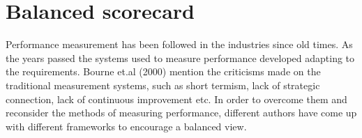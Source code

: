 



\section{Balanced scorecard}
Performance measurement has been followed in the industries since old times. As the years passed the systems used to measure performance developed adapting to the requirements. Bourne et.al (2000) mention the criticisms made on the traditional measurement systems, such as short termism, lack of strategic connection, lack of continuous improvement etc. In order to overcome them and reconsider the methods of measuring performance, different authors have come up with different frameworks to encourage a balanced view. \\ 

